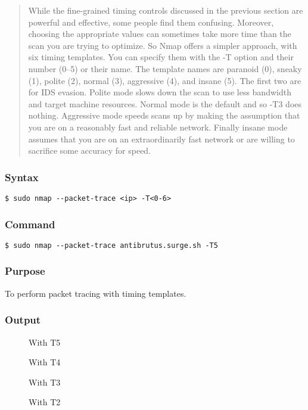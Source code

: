 \documentclass[11pt]{article}
\begin{document}
\begin{quotation}
    While the fine-grained timing controls discussed in the previous section are powerful and effective, some people find them confusing. Moreover, choosing the appropriate values can sometimes take more time than the scan you are trying to optimize. So Nmap offers a simpler approach, with six timing templates. You can specify them with the -T option and their number (0–5) or their name. The template names are paranoid (0), sneaky (1), polite (2), normal (3), aggressive (4), and insane (5). The first two are for IDS evasion. Polite mode slows down the scan to use less bandwidth and target machine resources. Normal mode is the default and so -T3 does nothing. Aggressive mode speeds scans up by making the assumption that you are on a reasonably fast and reliable network. Finally insane mode assumes that you are on an extraordinarily fast network or are willing to sacrifice some accuracy for speed.
\end{quotation}
    

\subsubsection{Syntax}
\begin{verbatim}
$ sudo nmap --packet-trace <ip> -T<0-6>
\end{verbatim}

\subsubsection*{Command}
\begin{verbatim}
$ sudo nmap --packet-trace antibrutus.surge.sh -T5
\end{verbatim}

\subsubsection*{Purpose}
To perform packet tracing with timing templates.

\subsubsection*{Output}
\begin{figure}[H]
    \centering
    \caption{With T5}
    \label{fig:1}
\end{figure}
\begin{figure}[H]
    \centering
    \caption{With T4}
    \label{fig:1}
\end{figure}
\begin{figure}[H]
    \centering
    \caption{With T3}
    \label{fig:1}
\end{figure}
\begin{figure}[H]
    \centering
    \caption{With T2}
    \label{fig:1}
\end{figure}
\end{document}

